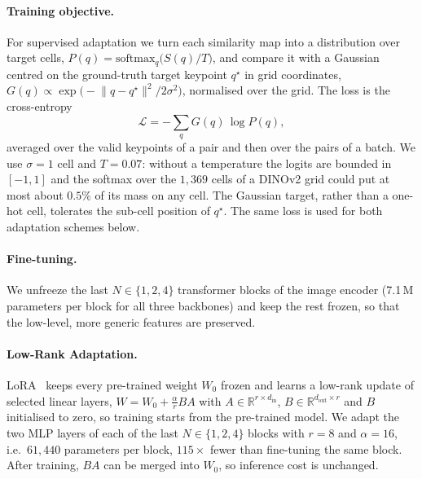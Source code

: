 \paragraph{Training objective.}
For supervised adaptation we turn each similarity map into a distribution over target cells, $P(q)=\mathrm{softmax}_q\big(S(q)/T\big)$, and compare it with a Gaussian centred on the ground-truth target keypoint $q^\star$ in grid coordinates, $G(q)\propto\exp\!\big(-\lVert q-q^\star\rVert^2/2\sigma^2\big)$, normalised over the grid. The loss is the cross-entropy
\begin{equation}
    \mathcal{L}=-\sum_{q} G(q)\,\log P(q),
    \label{eq:loss}
\end{equation}
averaged over the valid keypoints of a pair and then over the pairs of a batch. We use $\sigma=1$ cell and $T=0.07$: without a temperature the logits are bounded in $[-1,1]$ and the softmax over the $1{,}369$ cells of a DINOv2 grid could put at most about $0.5\%$ of its mass on any cell. The Gaussian target, rather than a one-hot cell, tolerates the sub-cell position of $q^\star$. The same loss is used for both adaptation schemes below.

\paragraph{Fine-tuning.}
We unfreeze the last $N\in\{1,2,4\}$ transformer blocks of the image encoder (7.1\,M parameters per block for all three backbones) and keep the rest frozen, so that the low-level, more generic features are preserved.

\paragraph{Low-Rank Adaptation.}
LoRA~\cite{hu2022lora} keeps every pre-trained weight $W_0$ frozen and learns a low-rank update of selected linear layers, $W=W_0+\tfrac{\alpha}{r}BA$ with $A\in\mathbb{R}^{r\times d_{\text{in}}}$, $B\in\mathbb{R}^{d_{\text{out}}\times r}$ and $B$ initialised to zero, so training starts from the pre-trained model. We adapt the two MLP layers of each of the last $N\in\{1,2,4\}$ blocks with $r=8$ and $\alpha=16$, i.e.\ $61{,}440$ parameters per block, $115\times$ fewer than fine-tuning the same block. After training, $BA$ can be merged into $W_0$, so inference cost is unchanged.
